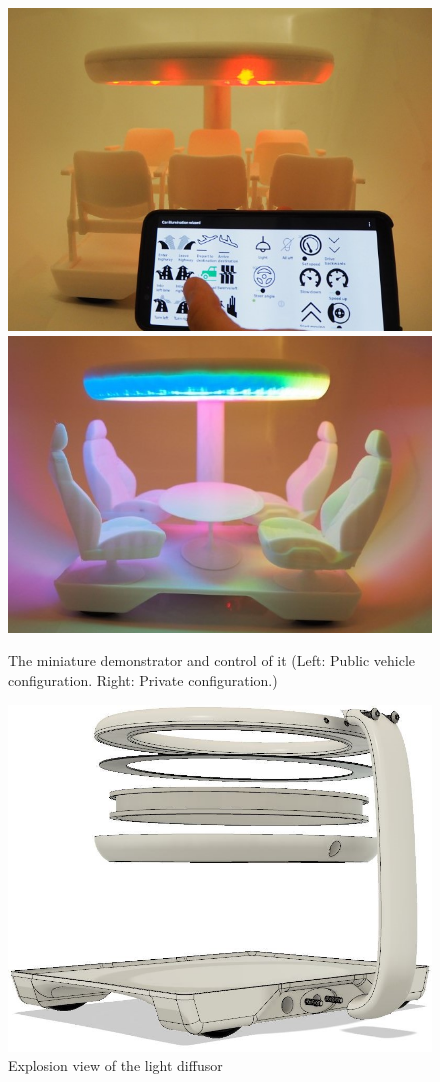 \begin{figure}
     \includegraphics[height=0.36\textwidth]{fig/public.JPG}\hfill\includegraphics[height=0.36\textwidth]{fig/private.JPG}
    \caption[Desktop Demonstrator]{The miniature demonstrator and control of it (Left:  Public vehicle configuration. Right: Private configuration.)}
    \label{fig:demonstrator}
\end{figure}
\begin{figure}
\includegraphics[height=0.38\textwidth]{fig/explosion.JPG}
    \caption[Explosion-view Demonstrator]{Explosion view of the light diffusor}
    \label{fig:demonstratorExplosion}
\end{figure}
